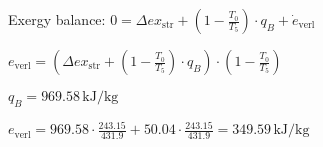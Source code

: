 Exergy balance:  
\( 0 = \Delta ex_{\text{str}} + \left( 1 - \frac{T_0}{T_5} \right) \cdot q_B + \dot{e}_{\text{verl}} \)  

\( e_{\text{verl}} = \left( \Delta ex_{\text{str}} + \left( 1 - \frac{T_0}{T_5} \right) \cdot q_B \right) \cdot \left( 1 - \frac{T_0}{T_5} \right) \)  

\( q_B = 969.58 \, \text{kJ/kg} \)  

\( e_{\text{verl}} = 969.58 \cdot \frac{243.15}{431.9} + 50.04 \cdot \frac{243.15}{431.9} = 349.59 \, \text{kJ/kg} \)